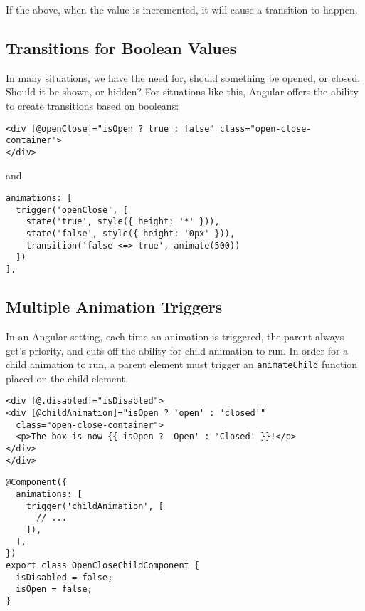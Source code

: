 If the above, when the value is incremented, it will cause a transition to 
happen. 


\subsection{ Transitions for Boolean Values }
In many situations, we have the need for, should something be opened, or closed. 
Should it be shown, or hidden? For situations like this, Angular offers the 
ability to create transitions based on booleans: 
\begin{lstlisting}[caption=open-close.component.html]
<div [@openClose]="isOpen ? true : false" class="open-close-container">
</div>
\end{lstlisting}
and
\begin{lstlisting}[caption=open-close.component.ts]
animations: [
  trigger('openClose', [
    state('true', style({ height: '*' })),
    state('false', style({ height: '0px' })),
    transition('false <=> true', animate(500))
  ])
],
\end{lstlisting}

\subsection{ Multiple Animation Triggers }
In an Angular setting, each time an animation is triggered, the parent always
get's priority, and cuts off the ability for child animation to run. In order 
for a child animation to run, a parent element must trigger an 
\lstinline{animateChild} function placed on the child element. 
\begin{lstlisting}[caption=open-close.component.html]
<div [@.disabled]="isDisabled">
<div [@childAnimation]="isOpen ? 'open' : 'closed'"
  class="open-close-container">
  <p>The box is now {{ isOpen ? 'Open' : 'Closed' }}!</p>
</div>
</div>  
\end{lstlisting}
\begin{lstlisting}[caption=open-close.component.ts]
@Component({
  animations: [
    trigger('childAnimation', [
      // ...
    ]),
  ],
})
export class OpenCloseChildComponent {
  isDisabled = false;
  isOpen = false;
}
\end{lstlisting}

